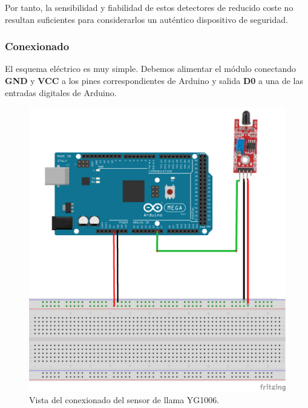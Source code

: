 Por tanto, la sensibilidad y fiabilidad de estos detectores de reducido coste no resultan suficientes para considerarlos un auténtico dispositivo de seguridad.\\
 
\subsubsection{Conexionado}

El esquema eléctrico es muy simple. Debemos alimentar el módulo conectando \textbf{GND} y \textbf{VCC} a los pines correspondientes de Arduino y salida \textbf{D0} a una de las 
entradas digitales de Arduino.\\

 \begin{figure}[H]
  \begin{center}
    \includegraphics[scale=0.5]{imagenes/llama_conexionado.png}
  \end{center}
  \caption{Vista del conexionado del sensor de llama YG1006.}
  \label{figura:sensor_mq_2_potenciometro}
\end{figure}

